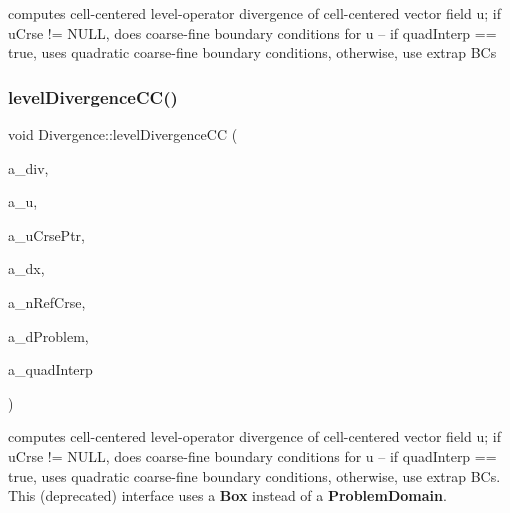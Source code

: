 computes cell-\/centered level-\/operator divergence of cell-\/centered vector field u; if u\+Crse != N\+U\+LL, does coarse-\/fine boundary conditions for u -- if quad\+Interp == true, uses quadratic coarse-\/fine boundary conditions, otherwise, use extrap BC\textquotesingle{}s \mbox{\label{class_divergence_a832809fde8a4344564e82a2a4881dccb}} 
\subsubsection{\texorpdfstring{level\+Divergence\+C\+C()}{levelDivergenceCC()}\hspace{0.1cm}{\footnotesize\ttfamily [2/3]}}
{\footnotesize\ttfamily void Divergence\+::level\+Divergence\+CC (\begin{DoxyParamCaption}\item[{\textbf{ Level\+Data}$<$ \textbf{ F\+Array\+Box} $>$ \&}]{a\+\_\+div,  }\item[{\textbf{ Level\+Data}$<$ \textbf{ F\+Array\+Box} $>$ \&}]{a\+\_\+u,  }\item[{\textbf{ Level\+Data}$<$ \textbf{ F\+Array\+Box} $>$ $\ast$}]{a\+\_\+u\+Crse\+Ptr,  }\item[{const \textbf{ Real}}]{a\+\_\+dx,  }\item[{const int}]{a\+\_\+n\+Ref\+Crse,  }\item[{const \textbf{ Box} \&}]{a\+\_\+d\+Problem,  }\item[{const bool}]{a\+\_\+quad\+Interp }\end{DoxyParamCaption})\hspace{0.3cm}{\ttfamily [static]}}

computes cell-\/centered level-\/operator divergence of cell-\/centered vector field u; if u\+Crse != N\+U\+LL, does coarse-\/fine boundary conditions for u -- if quad\+Interp == true, uses quadratic coarse-\/fine boundary conditions, otherwise, use extrap BC\textquotesingle{}s. This (deprecated) interface uses a \textbf{ Box} instead of a \textbf{ Problem\+Domain}. \mbox{\label{class_divergence_a8714fec933884a4b9e6f8173e22574e3}} 
